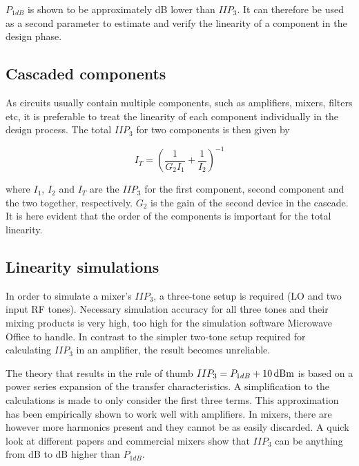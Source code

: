 			$P_{1dB}$ is shown to be approximately \unit[10]{dB} lower than $IIP_3$.\autocite{kundert02} It can therefore be used as a second parameter to estimate and verify the linearity of a component in the design phase. %

		\subsection{Cascaded components}\label{sec:casc_iip3}
			As circuits usually contain multiple components, such as amplifiers, mixers, filters etc, it is preferable to treat the linearity of each component individually in the design process. The total $IIP_3$ for two components is then given by \autocite{pozar90}

			\begin{equation}\label{eq:casciip3}
				I_T=\left ( \frac{1}{G_2I_1} + \frac{1}{I_2} \right )^{-1}
			\end{equation}

			where $I_1$, $I_2$ and $I_T$ are the $IIP_3$ for the first component, second component and the two together, respectively. $G_2$ is the gain of the second device in the cascade. It is here evident that the order of the components is important for the total linearity.

		\subsection{Linearity simulations}
			In order to simulate a mixer's $IIP_3$, a three-tone setup is required (LO and two input RF tones). Necessary simulation accuracy for all three tones and their mixing products is very high, too high for the simulation software Microwave Office to handle. In contrast to the simpler two-tone setup required for calculating $IIP_3$ in an amplifier, the result becomes unreliable.

			The theory that results in the rule of thumb $IIP_3=P_{1dB}+\unit[10]{dBm}$ is based on a power series expansion of the transfer characteristics. A simplification to the calculations is made to only consider the first three terms. This approximation has been empirically shown to work well with amplifiers. In mixers, there are however more harmonics present and they cannot be as easily discarded. A quick look at different papers and commercial mixers show that $IIP_3$ can be anything from \unit[6]{dB} to \unit[14]{dB} higher than $P_{1dB}$.

